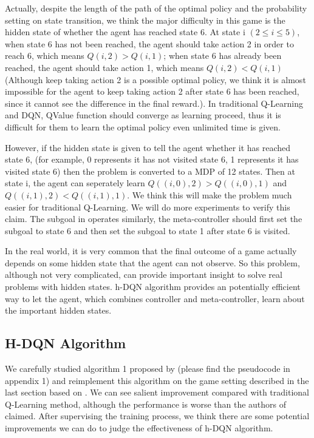 \documentclass{article}
\begin{document}
\begin{spacing}{1.1}
    Actually, despite the length of the path of the optimal policy and the probability setting on state transition, we think the major difficulty in this game is the hidden state of whether the agent has reached state 6. At state i $(2\leq i\leq 5)$, when state 6 has not been reached, the agent should take action 2 in order to reach 6, which means $Q(i, 2) > Q(i, 1)$; when state 6 has already been reached, the agent should take action 1, which means $Q(i, 2) < Q(i, 1)$ (Although keep taking action 2 is a possible optimal policy, we think it is almost impossible for the agent to keep taking action 2 after state 6 has been reached, since it cannot see the difference in the final reward.). In traditional Q-Learning and DQN, QValue function should converge as learning proceed, thus it is difficult for them to learn the optimal policy even unlimited time is given.

    However, if the hidden state is given to tell the agent whether it has reached state 6, (for example, 0 represents it has not visited state 6, 1 represents it has visited state 6) then the problem is converted to a MDP of 12 states. Then at state i, the agent can seperately learn $Q((i, 0), 2) > Q((i, 0), 1)$ and $Q((i, 1), 2) < Q((i, 1), 1)$. We think this will make the problem much easier for traditional Q-Learning. We will do more experiments to verify this claim. The subgoal in \cite{AI-16} operates similarly, the meta-controller should first set the subgoal to state 6 and then set the subgoal to state 1 after state 6 is visited.

    In the real world, it is very common that the final outcome of a game actually depends on some hidden state that the agent can not observe. So this problem, although not very complicated, can provide important insight to solve real problems with hidden states. h-DQN algorithm provides an potentially efficient way to let the agent, which combines controller and meta-controller, learn about the important hidden states.
    \subsection{H-DQN Algorithm}
    We carefully studied algorithm 1 proposed by \cite{AI-16} (please find the pseudocode in appendix 1) and reimplement this algorithm on the game setting described in the last section based on \cite{github}. We can see salient improvement compared with traditional Q-Learning method, although the performance is worse than the authors of \cite{AI-16} claimed. After supervising the training process, we think there are some potential improvements we can do to judge the effectiveness of h-DQN algorithm.


\end{spacing}
\end{document}

